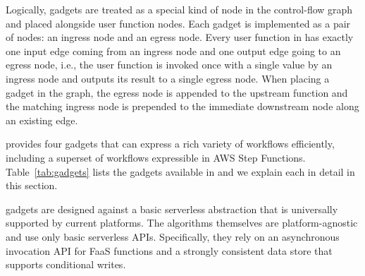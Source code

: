 Logically, gadgets are treated as a special kind of node in the control-flow
graph and placed alongside user function nodes. Each gadget is implemented as
a pair of nodes: an ingress node and an egress node. Every user function in
\name{} has exactly one input edge coming from an ingress node and one output
edge going to an egress node, i.e., the user function is invoked once with a
single value by an ingress node and outputs its result to a single egress
node. When placing a gadget in the graph, the egress node is appended to the
upstream function and the matching ingress node is prepended to the immediate
downstream node along an existing edge.

\name{} provides four gadgets that can express a rich variety of workflows
efficiently, including a superset of workflows expressible in AWS Step
Functions. Table~\ref{tab:gadgets} lists the gadgets available in \name{} and
we explain each in detail in this section.

\name{} gadgets are designed against a basic serverless abstraction that is
universally supported by current platforms. The algorithms themselves are
platform-agnostic and use only basic serverless APIs. Specifically, they rely
on an asynchronous invocation API for FaaS functions and a strongly consistent
data store that supports conditional writes.






